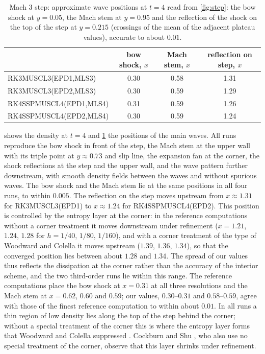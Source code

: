 \documentclass[11pt,a4paper]{article}
\numberwithin{equation}{section}
\begin{document}
\begin{table}[!htbp]
\centering
\caption{Mach 3 step: approximate wave positions at $t=4$ read from \cref{fig:step}: the bow shock at $y=0.05$, the Mach stem at $y=0.95$ and the reflection of the shock on the top of the step at $y=0.215$ (crossings of the mean of the adjacent plateau values), accurate to about $0.01$.}\label{tab:steppos}
\footnotesize
\begin{tabular}{lccc}
\toprule
& bow shock, $x$ & Mach stem, $x$ & reflection on step, $x$\\
\midrule
RK3MUSCL3(EPD1,MLS3) & 0.30 & 0.58 & 1.31\\
RK3MUSCL3(EPD2,MLS3) & 0.30 & 0.59 & 1.29\\
RK4SSPMUSCL4(EPD1,MLS4) & 0.31 & 0.59 & 1.26\\
RK4SSPMUSCL4(EPD2,MLS4) & 0.30 & 0.59 & 1.24\\
\bottomrule
\end{tabular}
\end{table}

 shows the density at $t=4$ and \cref{tab:steppos} the positions of the main waves. All runs reproduce the bow shock in front of the step, the Mach stem at the upper wall with its triple point at $y\approx0.73$ and slip line, the expansion fan at the corner, the shock reflections at the step and the upper wall, and the wave pattern further downstream, with smooth density fields between the waves and without spurious waves. The bow shock and the Mach stem lie at the same positions in all four runs, to within $0.005$. The reflection on the step moves upstream from $x\approx1.31$ for RK3MUSCL3(EPD1) to $x\approx1.24$ for RK4SSPMUSCL4(EPD2). This position is controlled by the entropy layer at the corner: in the reference computations without a corner treatment it moves downstream under refinement ($x=1.21$, $1.24$, $1.28$ for $h=1/40$, $1/80$, $1/160$), and with a corner treatment of the type of Woodward and Colella it moves upstream ($1.39$, $1.36$, $1.34$), so that the converged position lies between about $1.28$ and $1.34$. The spread of our values thus reflects the dissipation at the corner rather than the accuracy of the interior scheme, and the two third-order runs lie within this range. The reference computations place the bow shock at $x=0.31$ at all three resolutions and the Mach stem at $x=0.62$, $0.60$ and $0.59$; our values, $0.30$--$0.31$ and $0.58$--$0.59$, agree with those of the finest reference computation to within about $0.01$. In all runs a thin region of low density lies along the top of the step behind the corner; without a special treatment of the corner this is where the entropy layer forms that Woodward and Colella suppressed \cite{Woodward1984}. Cockburn and Shu \cite{CockburnShu1998}, who also use no special treatment of the corner, observe that this layer shrinks under refinement.
\end{document}
